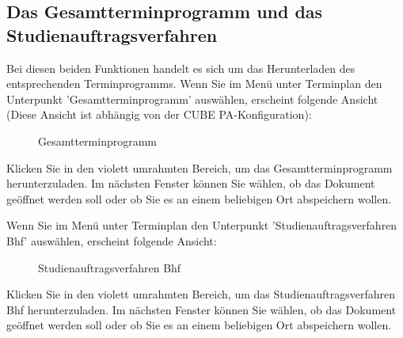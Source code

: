 \vspace{5cm} 

\subsection{Das Gesamtterminprogramm und das Studienauftragsverfahren}

Bei diesen beiden Funktionen handelt es sich um das Herunterladen des entsprechenden Terminprogramms.\newline
Wenn Sie im Menü unter Terminplan den Unterpunkt 'Gesamtterminprogramm' auswählen, erscheint folgende Ansicht (Diese Ansicht ist abhängig von der CUBE PA-Konfiguration):
\begin{figure}[H]
\caption{Gesamtterminprogramm}
\end{figure}

Klicken Sie in den violett umrahmten Bereich, um das Gesamtterminprogramm herunterzuladen. Im nächsten Fenster können Sie wählen, ob das Dokument geöffnet werden soll oder ob Sie es an einem beliebigen Ort abspeichern wollen.

\vspace{\baselineskip}

Wenn Sie im Menü unter Terminplan den Unterpunkt 'Studienauftragsverfahren Bhf' auswählen, erscheint folgende Ansicht:

\begin{figure}[H]
\caption{Studienauftragsverfahren Bhf}
\end{figure}

Klicken Sie in den violett umrahmten Bereich, um das Studienauftragsverfahren Bhf herunterzuladen. Im nächsten Fenster können Sie wählen, ob das Dokument geöffnet werden soll oder ob Sie es an einem beliebigen Ort abspeichern wollen.

